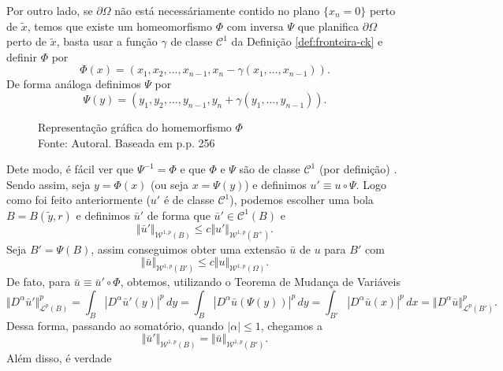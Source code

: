 \documentclass[a4paper, 11pt]{book}
\theoremstyle{definition}
\newcommand{\cC}{\mathcal{C}}
\newcommand{\cL}{\mathcal{L}}
\newcommand{\cW}{\mathcal{W}}
\begin{document}
\begin{prf}
    Por outro lado, se $\partial\Omega$ não está necessáriamente contido no plano $\{x_n = 0\}$ perto de $\tilde x$, temos que existe um homeomorfismo $\Phi$ com inversa $\Psi$ que planifica $\partial \Omega$ perto de $\tilde x$, basta usar a função $\gamma$ de classe $\cC^1$ da Definição \ref{def:fronteira-ck} e definir $\Phi$ por
    \begin{equation} \label{eq:Phi}
        \Phi(x) = (x_1,x_2,...,x_{n-1}, x_n - \gamma(x_1,\dots,x_{n-1})).
    \end{equation}
    De forma análoga definimos $\Psi$ por
    \begin{equation} \label{eq:Psi}
        \Psi(y) = (y_1,y_2,\dots,y_{n-1},y_n + \gamma(y_1,\dots,y_{n-1})).
    \end{equation}
    \begin{figure}
        \centering
        
        \caption{Representação gráfica do homemorfismo $\Phi$\\Fonte: Autoral. Baseada em \cite{evans-pde} p.p. 256}
    \end{figure}
    Dete modo, é fácil ver que $\Psi^{-1} = \Phi$ e que $\Phi$ e $\Psi$ são de classe $\cC^1$ (por definição) . Sendo assim, seja $y = \Phi(x)$ (ou seja $x = \Psi(y)$) e definimos $u' \equiv u \circ \Psi$. Logo como foi feito anteriormente ($u'$ é de classe $\cC^1$), podemos escolher uma bola $B = B(\tilde y, r)$ e definimos $\bar u'$ de forma que $\bar u' \in \cC^1(B)$ e
    \begin{equation} \label{eq:BBBB}
        \Vert \bar u' \Vert_{\cW^{1,p}(B)} \leqslant c \Vert u' \Vert_{\cW^{1,p}(B^+)}.
    \end{equation}
    Seja $B' = \Psi(B)$, assim conseguimos obter uma extensão $\bar u$ de $u$ para $B'$ com
    \[
        \Vert \bar u \Vert_{\cW^{1,p}(B')} \leqslant c \Vert u \Vert_{\cW^{1,p}(\Omega)}.
    \]
    De fato, para $\bar u \equiv \bar u' \circ \Phi$, obtemos, utilizando o Teorema de Mudança de Variáveis
    \[
        \Vert D^\alpha \bar u' \Vert_{\cL^p(B)}^p = \int_B |D^\alpha \bar u'(y)|^p \,dy = \int_B |D^\alpha \bar u (\Psi (y))|^p \,dy = \int_{B'} |D^\alpha \bar u (x)|^p \,dx = \Vert D^\alpha \bar u \Vert_{\cL^p(B')}^p.
    \]
    Dessa forma, passando ao somatório, quando $|\alpha| \leqslant 1$, chegamos a
    \begin{equation} \label{eq:normaBigualnormaW}
        \Vert \bar u' \Vert_{\cW^{1,p}(B)} = \Vert  \bar u \Vert_{\cW^{1,p}(B')}.
    \end{equation}
    Além disso, é verdade

\end{prf}
\end{document}
